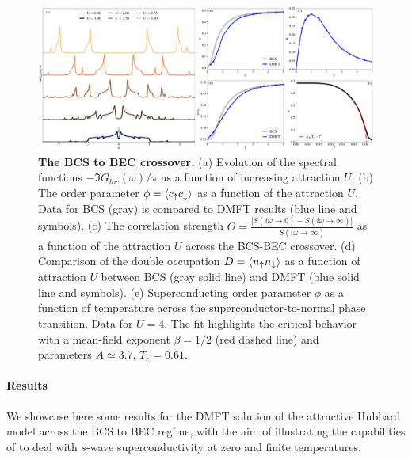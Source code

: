 \documentclass[edipack2.tex]{subfiles}
\begin{document}
\begin{figure}[t!]
  \includegraphics[width=\linewidth]{figures/figAHM.pdf}
    \caption{\label{figEx2}%
      \textbf{The BCS to BEC crossover.}
      (a) Evolution of the spectral functions
      $-\Im{G_{loc}(\omega)}/\pi$ as a function of increasing
      attraction $U$. 
      (b) The order parameter $\phi=\langle c_\uparrow c_\downarrow\rangle$ as a
      function of the attraction $U$. Data for BCS (gray) is compared
      to DMFT results (blue line and symbols). 
      (c) The correlation strength
      $\Theta=\frac{|S(i\omega\to0)-S(i\omega\to\infty)|}{S(i\omega\to\infty)}$ as a function of the
      attraction $U$ across the BCS-BEC crossover. 
      (d) Comparison of the double occupation $D=\langle n_\uparrow
      n_\downarrow\rangle$ as a function of attraction $U$ between BCS (gray
      solid line) and DMFT (blue solid line and symbols). 
      (e) Superconducting order
      parameter $\phi$ as a function of temperature across the
      superconductor-to-normal phase transition. Data for $U=4$. The
      fit highlights the critical behavior with a mean-field exponent
      $\beta=1/2$ (red dashed line) and parameters $A\simeq 3.7$, $T_c=0.61$.       
        }
\end{figure}

\paragraph{Results}
We showcase here some results for the DMFT solution of the attractive
Hubbard model across the BCS to BEC regime, with the aim of
illustrating the capabilities of \NAME to deal with $s$-wave
superconductivity at zero and finite temperatures.
\end{document}
